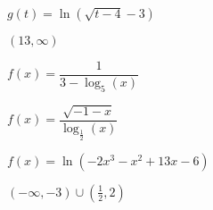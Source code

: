 \documentclass{ximera}
\begin{document}
\begin{question}
\begin{problem}
$g(t) = \ln(\sqrt{t - 4} - 3)$

\begin{solution}
$(13, \infty)$
\end{solution}
\end{problem}

\begin{problem}
$f(x) = \dfrac{1}{3 - \log_{5} (x)}$
\end{problem}

\begin{problem}
$f(x) = \dfrac{\sqrt{-1 - x}}{\log_{\frac{1}{2}} (x)}$
\end{problem}

\begin{problem}\label{domainloglast}
$f(x) = \ln(-2x^{3} - x^{2} + 13x - 6)$  

\begin{solution}
$(-\infty, -3) \cup \left(\frac{1}{2}, 2\right)$
\end{solution}
\end{problem}

\end{question}
\end{document}
